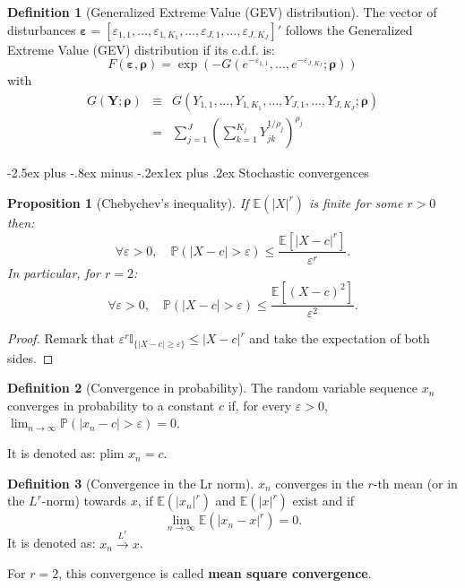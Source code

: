 \documentclass[
  11pt,
]{book}
\makeatletter
\renewcommand\subsection{\@startsection{subsection}{2}{\z@}
  {-2.5ex plus -.8ex minus -.2ex}{1ex plus .2ex}
  {\normalfont\large\bfseries\color{TextbookInk}}}
\newtheorem{proposition}{Proposition}[chapter]
\theoremstyle{definition}
\newtheorem{definition}{Definition}[chapter]
\theoremstyle{definition}
\theoremstyle{definition}
\theoremstyle{definition}
\theoremstyle{remark}
\makeatother
\begin{document}
\begin{definition}[Generalized Extreme Value (GEV) distribution]
\protect\hypertarget{def:GEVdistri}{}\label{def:GEVdistri}The vector of disturbances \(\boldsymbol\varepsilon=[\varepsilon_{1,1},\dots,\varepsilon_{1,K_1},\dots,\varepsilon_{J,1},\dots,\varepsilon_{J,K_J}]'\) follows the Generalized Extreme Value (GEV) distribution if its c.d.f. is:
\[
F(\boldsymbol\varepsilon,\boldsymbol\rho) = \exp(-G(e^{-\varepsilon_{1,1}},\dots,e^{-\varepsilon_{J,K_J}};\boldsymbol\rho))
\]
with
\begin{eqnarray*}
G(\mathbf{Y};\boldsymbol\rho) &\equiv&  G(Y_{1,1},\dots,Y_{1,K_1},\dots,Y_{J,1},\dots,Y_{J,K_J};\boldsymbol\rho) \\
&=& \sum_{j=1}^J\left(\sum_{k=1}^{K_j} Y_{jk}^{1/\rho_j}
\right)^{\rho_j}
\end{eqnarray*}
\end{definition}

\subsection{Stochastic convergences}\label{StochConvergences}

\begin{proposition}[Chebychev's inequality]
\protect\hypertarget{prp:chebychev}{}\label{prp:chebychev}If \(\mathbb{E}(|X|^r)\) is finite for some \(r>0\) then:
\[
\forall \varepsilon > 0, \quad \mathbb{P}(|X - c|>\varepsilon) \le \frac{\mathbb{E}[|X - c|^r]}{\varepsilon^r}.
\]
In particular, for \(r=2\):
\[
\forall \varepsilon > 0, \quad \mathbb{P}(|X - c|>\varepsilon) \le \frac{\mathbb{E}[(X - c)^2]}{\varepsilon^2}.
\]
\end{proposition}

\begin{proof}
Remark that \(\varepsilon^r \mathbb{I}_{\{|X-c| \ge \varepsilon\}} \le |X-c|^r\) and take the expectation of both sides.
\end{proof}

\begin{definition}[Convergence in probability]
\protect\hypertarget{def:convergenceproba}{}\label{def:convergenceproba}The random variable sequence \(x_n\) converges in probability to a constant \(c\) if, for every \(\varepsilon>0\), \(\lim_{n \rightarrow \infty} \mathbb{P}(|x_n - c|>\varepsilon) = 0\).

It is denoted as: \(\mbox{plim } x_n = c\).
\end{definition}

\begin{definition}[Convergence in the Lr norm]
\protect\hypertarget{def:convergenceLr}{}\label{def:convergenceLr}\(x_n\) converges in the \(r\)-th mean (or in the \(L^r\)-norm) towards \(x\), if \(\mathbb{E}(|x_n|^r)\) and \(\mathbb{E}(|x|^r)\) exist and if
\[
\lim_{n \rightarrow \infty} \mathbb{E}(|x_n - x|^r) = 0.
\]
It is denoted as: \(x_n \overset{L^r}{\rightarrow} x\).

For \(r=2\), this convergence is called \textbf{mean square convergence}.
\end{definition}
\end{document}
